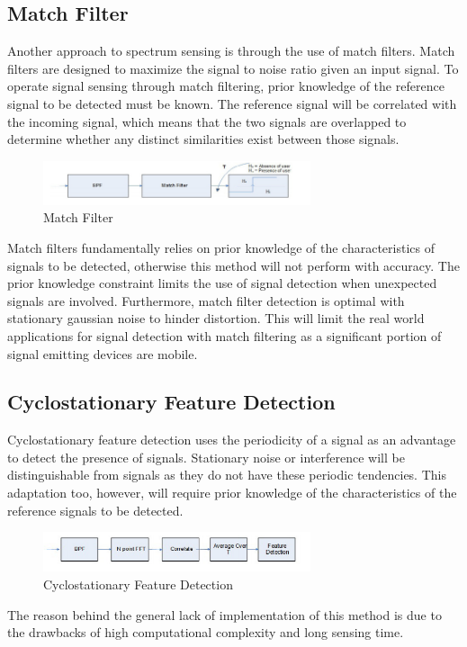 \subsection{Match Filter}
Another approach to spectrum sensing is through the use of match filters. Match filters are designed to maximize the signal to noise ratio given an input signal. To operate signal sensing through match filtering, prior knowledge of the reference signal to be detected must be known. The reference signal will be correlated with the incoming signal, which means that the two signals are overlapped to determine whether any distinct similarities exist between those signals.
\begin{figure}[ht]
\centering
\includegraphics[width=0.70\textwidth]{img/match_filter.png}
\caption{Match Filter}
\label{fig:match_filter}
\end{figure}\par
Match filters fundamentally relies on prior knowledge of the characteristics of signals to be detected, otherwise this method will not perform with accuracy. The prior knowledge constraint limits the use of signal detection when unexpected signals are involved. Furthermore, match filter detection is optimal with stationary gaussian noise to hinder distortion. This will limit the real world applications for signal detection with match filtering as a significant portion of signal emitting devices are mobile.

\subsection{Cyclostationary Feature Detection}
Cyclostationary feature detection uses the periodicity of a signal as an advantage to detect the presence of signals. Stationary noise or interference will be distinguishable from signals as they do not have these periodic tendencies. This adaptation too, however, will require prior knowledge of the characteristics of the reference signals to be detected.
\begin{figure}[ht]
\centering
\includegraphics[width=0.70\textwidth]{img/cyclostationary_feature.png}
\caption{Cyclostationary Feature Detection}
\label{fig:cyclo_detection}
\end{figure}\par
The reason behind the general lack of implementation of this method is due to the drawbacks of high computational complexity and long sensing time.

